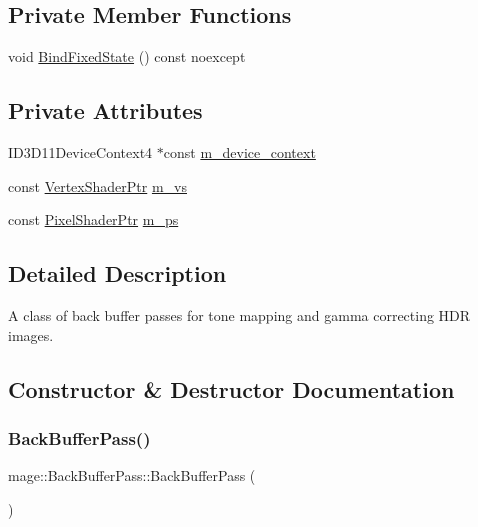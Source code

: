 \subsection*{Private Member Functions}
\begin{DoxyCompactItemize}
\item 
void \hyperlink{classmage_1_1_back_buffer_pass_a4e66e041f37dddb4a26c549f4dc090a6}{Bind\+Fixed\+State} () const noexcept
\end{DoxyCompactItemize}
\subsection*{Private Attributes}
\begin{DoxyCompactItemize}
\item 
I\+D3\+D11\+Device\+Context4 $\ast$const \hyperlink{classmage_1_1_back_buffer_pass_a08d816be20d35edae0b8fc7975bde76d}{m\+\_\+device\+\_\+context}
\item 
const \hyperlink{namespacemage_a1f19b094f771e30bc0a6c1cebcc0dd58}{Vertex\+Shader\+Ptr} \hyperlink{classmage_1_1_back_buffer_pass_a1ad5c084edf77f7462336fd48e45c5c7}{m\+\_\+vs}
\item 
const \hyperlink{namespacemage_acbec875bb5e5e085e32ed244a24d2b6f}{Pixel\+Shader\+Ptr} \hyperlink{classmage_1_1_back_buffer_pass_a4fdc3c01db3a46a63b173d08fd0972d7}{m\+\_\+ps}
\end{DoxyCompactItemize}


\subsection{Detailed Description}
A class of back buffer passes for tone mapping and gamma correcting H\+DR images. 

\subsection{Constructor \& Destructor Documentation}
\hypertarget{classmage_1_1_back_buffer_pass_a46ce63d05208fc3dea43244713a6a280}{}\label{classmage_1_1_back_buffer_pass_a46ce63d05208fc3dea43244713a6a280} 
\subsubsection{\texorpdfstring{Back\+Buffer\+Pass()}{BackBufferPass()}\hspace{0.1cm}{\footnotesize\ttfamily [1/3]}}
{\footnotesize\ttfamily mage\+::\+Back\+Buffer\+Pass\+::\+Back\+Buffer\+Pass (\begin{DoxyParamCaption}{ }\end{DoxyParamCaption})}

